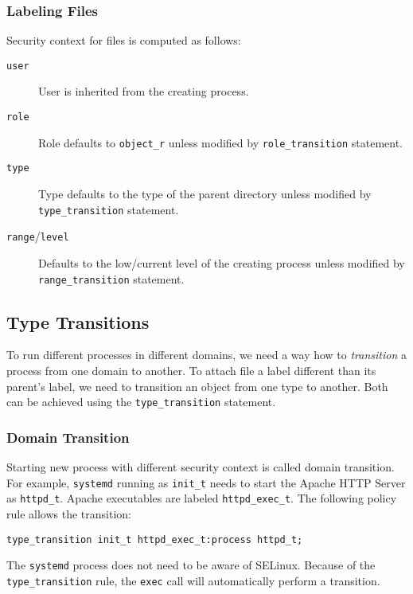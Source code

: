 \subsubsection{Labeling Files}
Security context for files is computed as follows:
\begin{description}
    \item [\texttt{user}] User is inherited from the creating process.
    \item [\texttt{role}] Role defaults to \texttt{object\_r} unless modified by
        \texttt{role\_transition} statement.
    \item [\texttt{type}] Type defaults to the type of the parent directory
        unless modified by \texttt{type\_transition} statement.
    \item [\texttt{range}/\texttt{level}] Defaults to the low/current level of
        the creating process unless modified by \texttt{range\_transition}
        statement.
\end{description}

\subsection{Type Transitions}

To run different processes in different domains, we need a way how to
\emph{transition} a process from one domain to another. To attach file a label
different than its parent's label, we need to transition an object from one type
to another. Both can be achieved using the \texttt{type\_transition} statement.

\subsubsection{Domain Transition}

Starting new process with different security context is called domain
transition. For example, \texttt{systemd} running as \texttt{init\_t} needs to
start the Apache HTTP Server as \texttt{httpd\_t}. Apache executables are
labeled \texttt{httpd\_exec\_t}. The following policy rule allows the
transition:
\begin{lstlisting}
type_transition init_t httpd_exec_t:process httpd_t;
\end{lstlisting}
The \texttt{systemd} process does not need to be aware of SELinux. Because of
the \texttt{type\_transition} rule, the \texttt{exec} call will automatically
perform a transition.

